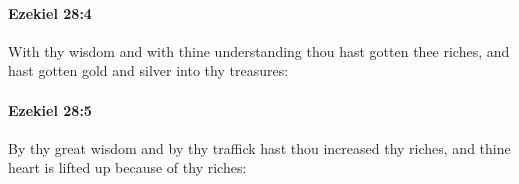 		\paragraph{Ezekiel 28:4} %
			\label{EZEKIEL-28-4}

			With thy wisdom and with thine understanding thou hast gotten thee riches, and hast gotten gold and silver into thy treasures:


		\paragraph{Ezekiel 28:5} %
			\label{EZEKIEL-28-5}

			By thy great wisdom and by thy traffick hast thou increased thy riches, and thine heart is lifted up because of thy riches:


